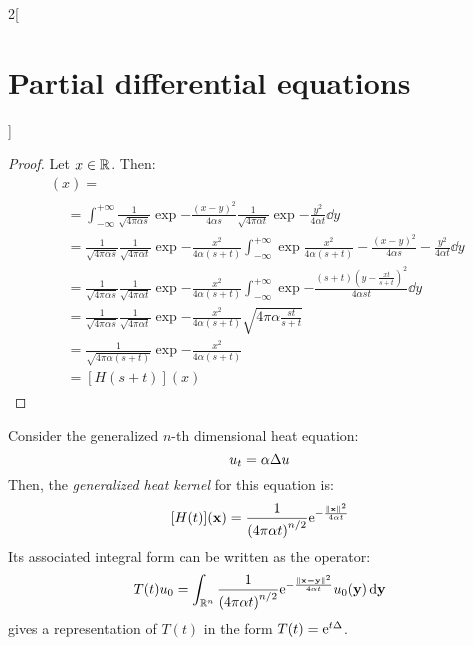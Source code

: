 \documentclass[../../../main_math.tex]{subfiles}
\begin{document}
\begin{multicols}{2}[\section{Partial differential equations}]
\begin{proof}
    Let $x\in\mathbb{R}$. Then:
    \begin{multline*}
      [H(s)*H(t)](x) =       \\
      \begin{aligned}
         & =\int_{-\infty}^{+\infty}\frac{1}{\sqrt{4\pi\alpha s}}\exp{-\frac{{(x-y)}^2}{4\alpha s}}\frac{1}{\sqrt{4\pi\alpha t}}\exp{-\frac{y^2}{4\alpha t}}\dd{y}                                                    \\
         & =\frac{1}{\sqrt{4\pi\alpha s}}\frac{1}{\sqrt{4\pi\alpha t}}\exp{-\frac{x^2}{4\alpha (s+t)}}\int_{-\infty}^{+\infty}\exp{\frac{x^2}{4\alpha (s+t)}-\frac{{(x-y)}^2}{4\alpha s}-\frac{y^2}{4\alpha t}}\dd{y} \\
         & =\frac{1}{\sqrt{4\pi\alpha s}}\frac{1}{\sqrt{4\pi\alpha t}}\exp{-\frac{x^2}{4\alpha (s+t)}}\int_{-\infty}^{+\infty}\exp{-\frac{(s+t){\left(y-\frac{xt}{s+t}\right)}^2}{4\alpha st}}\dd{y}                  \\
         & =\frac{1}{\sqrt{4\pi\alpha s}}\frac{1}{\sqrt{4\pi\alpha t}}\exp{-\frac{x^2}{4\alpha (s+t)}}\sqrt{4\pi\alpha \frac{st}{s+t}}                                                                                \\
         & =\frac{1}{\sqrt{4\pi\alpha (s+t)}}\exp{-\frac{x^2}{4\alpha (s+t)}}                                                                                                                                         \\
         & = [H(s+t)](x)
      \end{aligned}
    \end{multline*}
  \end{proof}
  \begin{proposition}
    Consider the generalized $n$-th dimensional heat equation:
    \begin{equation}
      u_t=\alpha\Delta u
    \end{equation} Then, the \emph{generalized heat kernel} for this equation is: $$[H(t)](\boldsymbol{\mathrm{x}}) = \frac{1}{{(4\pi\alpha t)}^{n/2}}\mathrm{e}^{-\frac{\left\|\boldsymbol{\mathrm{x}}\right\|^2}{4\alpha t}}$$ Its associated integral form can be written as the operator:
    \begin{equation}\label{PDE:Toperator}
      T(t)u_0=\int_{\mathbb{R}^n}\frac{1}{{(4\pi\alpha t)}^{n/2}}\mathrm{e}^{-\frac{\left\|\boldsymbol{\mathrm{x-y}}\right\|^2}{4\alpha t}}u_0(\boldsymbol{\mathrm{y}})\dd{\boldsymbol{\mathrm{y}}}
    \end{equation}
     gives a representation of $T(t)$ in the form $T(t)=\mathrm{e}^{t\Delta}$.
  \end{proposition}

\end{multicols}
\end{document}
